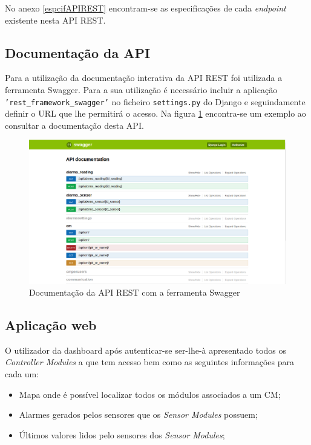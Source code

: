 No anexo \ref{espcifAPIREST} encontram-se as especificações de cada \textit{endpoint} existente nesta API REST.






\subsection{Documentação da \ac{API}}

Para a utilização da documentação interativa da API REST foi utilizada a ferramenta Swagger. Para a sua utilização é necessário incluir a aplicação \texttt{'rest\_framework\_swagger'} no ficheiro \texttt{settings.py} do Django e seguindamente definir o \ac{URL} que lhe permitirá o acesso. Na figura \ref{docapi} encontra-se um exemplo ao consultar a documentação desta API. 

\newpage

\begin{figure}[h]
	\centering
	\includegraphics[width=\linewidth]{prints-web/api-doc.png}
	\caption{Documentação da API REST com a ferramenta Swagger}
	\label{docapi}
\end{figure}


\subsection{Aplicação web}

O utilizador da dashboard após autenticar-se ser-lhe-à apresentado todos os \textit{Controller Modules} a que tem acesso bem como as seguintes informações para cada um:


\begin{itemize}
	\item Mapa onde é possível localizar todos os módulos associados a um \acl{CM}; 
	
	\item Alarmes gerados pelos sensores que os \textit{Sensor Modules} possuem; 
	
	\item Últimos valores lidos pelo sensores dos \textit{Sensor Modules}; 
\end{itemize} 



